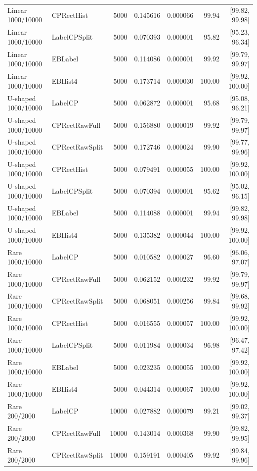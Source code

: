 \begin{longtable}{llrrrrr}
Linear 1000/10000 & CPRectHist & 5000 & 0.145616 & 0.000066 & 99.94 & [99.82, 99.98]\\
Linear 1000/10000 & LabelCPSplit & 5000 & 0.070393 & 0.000001 & 95.82 & [95.23, 96.34]\\
Linear 1000/10000 & EBLabel & 5000 & 0.114086 & 0.000001 & 99.92 & [99.79, 99.97]\\
Linear 1000/10000 & EBHist4 & 5000 & 0.173714 & 0.000030 & 100.00 & [99.92, 100.00]\\
U-shaped 1000/10000 & LabelCP & 5000 & 0.062872 & 0.000001 & 95.68 & [95.08, 96.21]\\
U-shaped 1000/10000 & CPRectRawFull & 5000 & 0.156880 & 0.000019 & 99.92 & [99.79, 99.97]\\
U-shaped 1000/10000 & CPRectRawSplit & 5000 & 0.172746 & 0.000024 & 99.90 & [99.77, 99.96]\\
U-shaped 1000/10000 & CPRectHist & 5000 & 0.079491 & 0.000055 & 100.00 & [99.92, 100.00]\\
U-shaped 1000/10000 & LabelCPSplit & 5000 & 0.070394 & 0.000001 & 95.62 & [95.02, 96.15]\\
U-shaped 1000/10000 & EBLabel & 5000 & 0.114088 & 0.000001 & 99.94 & [99.82, 99.98]\\
U-shaped 1000/10000 & EBHist4 & 5000 & 0.135382 & 0.000044 & 100.00 & [99.92, 100.00]\\
Rare 1000/10000 & LabelCP & 5000 & 0.010582 & 0.000027 & 96.60 & [96.06, 97.07]\\
Rare 1000/10000 & CPRectRawFull & 5000 & 0.062152 & 0.000232 & 99.92 & [99.79, 99.97]\\
Rare 1000/10000 & CPRectRawSplit & 5000 & 0.068051 & 0.000256 & 99.84 & [99.68, 99.92]\\
Rare 1000/10000 & CPRectHist & 5000 & 0.016555 & 0.000057 & 100.00 & [99.92, 100.00]\\
Rare 1000/10000 & LabelCPSplit & 5000 & 0.011984 & 0.000034 & 96.98 & [96.47, 97.42]\\
Rare 1000/10000 & EBLabel & 5000 & 0.023235 & 0.000055 & 100.00 & [99.92, 100.00]\\
Rare 1000/10000 & EBHist4 & 5000 & 0.044314 & 0.000067 & 100.00 & [99.92, 100.00]\\
Rare 200/2000 & LabelCP & 10000 & 0.027882 & 0.000079 & 99.21 & [99.02, 99.37]\\
Rare 200/2000 & CPRectRawFull & 10000 & 0.143014 & 0.000368 & 99.90 & [99.82, 99.95]\\
Rare 200/2000 & CPRectRawSplit & 10000 & 0.159191 & 0.000405 & 99.92 & [99.84, 99.96]\\

\end{longtable}
